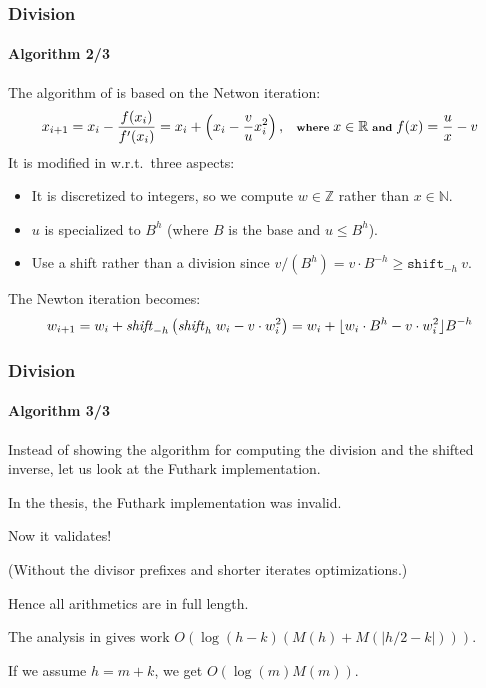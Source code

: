       
\begin{frame}[fragile]
  \frametitle{Division}
  \framesubtitle{Algorithm 2/3}
  The algorithm of \cite{watt2023efficient} is based on the Netwon iteration:\vspace*{-0.5em}
  \begin{equation}\scriptsize
  x_{i+1} = x_i - \dfrac{f(x_i)}{f'(x_i)} = x_i + \left( x_i - \dfrac{v}{u}x^2_i \right),\quad \textbf{where}~x\in \mathbb{R}~ \textbf{and}~ f(x) = \dfrac{u}{x} - v
\end{equation}\pause
It is modified in \cite{watt2023efficient} w.r.t.\ three aspects:
\begin{itemize}\footnotesize
\item It is discretized to integers, so we compute $w\in\mathbb{Z}$ rather than $x\in\mathbb{N}$.\pause
\item $u$ is specialized to $B^h$ (where $B$ is the base and $u \leq B^h$).\pause
\item Use a shift rather than a division since $v/(B^h)=v\cdot B^{-h}\geq \mathtt{shift}_{-h}~v$.
\end{itemize}\pause
The Newton iteration becomes:\vspace*{-0.5em}
\begin{equation}\scriptsize
  w_{i+1} =  w_i + \mathit{shift}_{-h}\left( \mathit{shift}_{h}~w_i - v\cdot w^2_i \right) =  w_i + \lfloor w_i\cdot B^h - v\cdot w^2_i \rfloor B^{-h}
\end{equation}
\end{frame}

\begin{frame}[fragile]
  \frametitle{Division}
  \framesubtitle{Algorithm 3/3}

  Instead of showing the algorithm for computing the division and the shifted
  inverse, let us look at the Futhark implementation.\vspace*{0.75em}\pause

  In the thesis, the Futhark implementation was {\red invalid}.

  Now it {\green validates}!

  (Without the divisor prefixes and shorter iterates optimizations.)\vspace*{0.75em}\pause

  Hence all arithmetics are in full length.

  The analysis in \cite{watt2023efficient} gives work $O(\log (h-k)(M(h)+M(|h/2 - k|)))$.

  If we assume $h=m+k$, we get $O(\log (m)M(m))$.
\end{frame}


